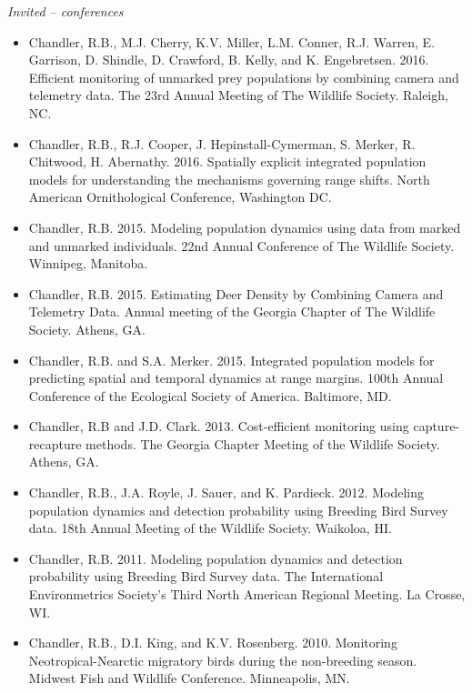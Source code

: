 \emph{Invited -- conferences}

\begin{itemize}

\item Chandler, R.B., M.J. Cherry, K.V. Miller, L.M. Conner,
  R.J. Warren, E. Garrison, D. Shindle, D. Crawford, B. Kelly, and K. 
  Engebretsen. 2016. Efficient monitoring of unmarked prey populations
  by combining camera and telemetry data. The 23rd Annual Meeting of
  The Wildlife Society. Raleigh, NC.

\item Chandler, R.B., R.J. Cooper, J. Hepinstall-Cymerman, S. Merker, R.
  Chitwood, H. Abernathy. 2016. Spatially explicit integrated
  population models for understanding the mechanisms governing range
  shifts. North American Ornithological Conference, Washington DC. 

\item Chandler, R.B. 2015. Modeling population dynamics using data
  from marked and unmarked individuals. 22nd Annual Conference of The
  Wildlife Society. Winnipeg, Manitoba.

\item Chandler, R.B. 2015. Estimating Deer Density by Combining Camera
  and Telemetry Data. Annual meeting of the Georgia Chapter of The
  Wildlife Society. Athens, GA.

\item Chandler, R.B. and S.A. Merker. 2015. Integrated population
  models for predicting spatial and temporal dynamics at range
  margins. 100th Annual Conference of the Ecological Society of
  America. Baltimore, MD. 

\item Chandler, R.B and J.D. Clark. 2013. Cost-efficient monitoring
  using capture-recapture methods. The Georgia Chapter Meeting of the
  Wildlife Society. Athens, GA.

\item Chandler, R.B., J.A. Royle, J. Sauer, and
  K. Pardieck. 2012. Modeling population dynamics and detection
  probability using Breeding Bird Survey data. 18th Annual Meeting of
  the Wildlife Society. Waikoloa, HI.

\item Chandler, R.B. 2011. Modeling population dynamics and detection
  probability using Breeding Bird Survey data. The International
  Environmetrics Society's Third North
  American Regional Meeting. La Crosse, WI.

\item Chandler, R.B., D.I. King, and K.V. Rosenberg. 2010. Monitoring
  Neotropical-Nearctic migratory birds during the non-breeding
  season. Midwest Fish and Wildlife Conference. Minneapolis, MN.

\end{itemize}

